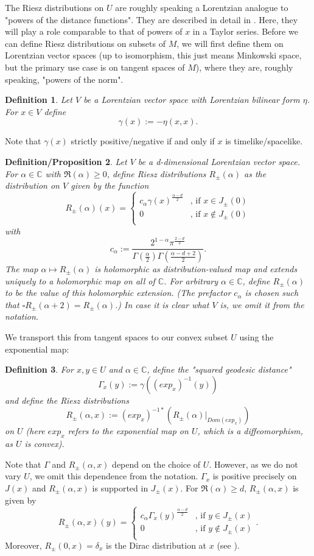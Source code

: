 \documentclass[11pt]{article}
\def\C{{\mathbb{C}}}
\def\casedist#1#2#3#4{
	\begin{cases}
		#1& \text{, if } #2\\
		#3& \text{, if } #4 \\
	\end{cases}}
\newtheorem{df}{Definition}[section]
\newtheorem{defprop}[df]{Definition/Proposition}
\begin{document}
The Riesz distributions on $U$ are roughly speaking a Lorentzian analogue to "powers of the distance functions". They are described in detail in \cite[sections 1.2 and 1.4]{BGP}. Here, they  will play a role comparable to that of powers of $x$ in a Taylor series. Before we can define Riesz distributions on subsets of $M$, we will first define them on Lorentzian vector spaces (up to isomorphism, this just means Minkowski space, but the primary use case is on tangent spaces of $M$), where they are, roughly speaking, "powers of the norm".
\begin{df}
	Let $V$ be a Lorentzian vector space with Lorentzian bilinear form $\eta$.
	For $x\in V$ define 
	\[\gamma(x):=-\eta(x,x).\]
\end{df}
Note that $\gamma(x)$ strictly positive/negative if and only if $x$ is timelike/spacelike.
\begin{defprop}
	\label{dfRiesz}
	Let $V$ be a d-dimensional Lorentzian vector space.
	For $\alpha\in \C$ with $\Re(\alpha)\geq 0$, define Riesz distributions $R_\pm(\alpha)$ as the distribution on $V$ given by the function
	\[R_\pm(\alpha)(x)=\casedist{c_\alpha\gamma(x)^{\frac{\alpha-d}{2}}}{x\in J_\pm(0)}{0}{x\notin J_\pm(0)}\]
	with
	\[c_\alpha:=\frac{2^{1-\alpha}\pi^\frac{2-d}{2}}{\Gamma(\frac{\alpha}{2})\Gamma(\frac{\alpha-d+2}{2})}.\]
	The map $\alpha\mapsto R_\pm(\alpha)$ is holomorphic as distribution-valued map and extends uniquely to a holomorphic map on all of $\C$. For arbitrary $\alpha\in\C$, define $R_\pm(\alpha)$ to be the value of this holomorphic extension. (The prefactor $c_\alpha$ is chosen such that $\square R_\pm(\alpha+2)=R_\pm(\alpha)$.) In case it is clear what $V$ is, we omit it from the notation.
\end{defprop}
We transport this from tangent spaces to our convex subset $U$ using the exponential map:
\begin{df}
	\label{dfGamma}
	For $x,y\in U$ and $\alpha\in \C$,
	define the "squared geodesic distance"
	\[\Gamma_x(y):=\gamma\left((exp_x)^{-1}(y)\right)\]
	and define the Riesz distributions
	\[R_\pm(\alpha,x):=(exp_x)^{-1*}(R_\pm(\alpha)|_{Dom(exp_x)})\]
	on $U$ (here $exp_x$ refers to the exponential map on $U$, which is a diffeomorphism, as $U$ is convex). 
\end{df}
Note that $\Gamma$ and $R_\pm(\alpha,x)$ depend on the choice of $U$. However, as we do not vary $U$, we omit this dependence from the notation.
$\Gamma_x$ is positive precisely on $J(x)$ and $R_\pm(\alpha,x)$ is supported in $J_\pm(x)$. For $\Re(\alpha)\geq d$, $R_\pm(\alpha,x)$ is given by \[R_\pm(\alpha,x)(y)=\casedist{c_\alpha\Gamma_x(y)^{\frac{\alpha-d}{2}}}{y\in J_\pm(x)}{0}{y\notin J_\pm(x)}.\]
Moreover, $R_\pm(0,x)=\delta_x$ is the Dirac distribution at $x$ (see \cite[Proposition 1.4.2]{BGP}).
\end{document}
